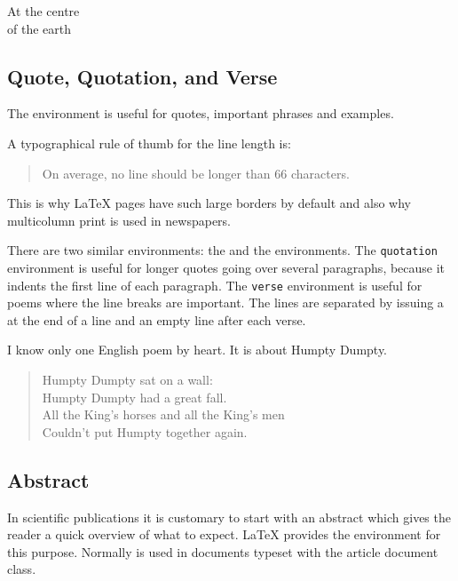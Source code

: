 \begin{example}
\begin{center}
At the centre\\of the earth
\end{center}
\end{example}

\subsection{Quote, Quotation, and Verse}

The  environment is useful for quotes, important phrases and
examples.

\begin{example}
A typographical rule of thumb
for the line length is:
\begin{quote}
On average, no line should
be longer than 66 characters.
\end{quote}
This is why \LaTeX{} pages have
such large borders by default
and also why multicolumn print
is used in newspapers.
\end{example}

There are two similar environments: the  and the
 environments. The \texttt{quotation} environment is useful
for longer quotes going over several paragraphs, because it indents the
first line of each paragraph. The \texttt{verse} environment is useful for poems
where the line breaks are important. The lines are separated by
issuing a \ci{\bs} at the end of a line and an empty line after each
verse.


\begin{example}
I know only one English poem by
heart. It is about Humpty Dumpty.
\begin{flushleft}
\begin{verse}
Humpty Dumpty sat on a wall:\\
Humpty Dumpty had a great fall.\\
All the King's horses and all
the King's men\\
Couldn't put Humpty together
again.
\end{verse}
\end{flushleft}
\end{example}

\subsection{Abstract}

In scientific publications it is customary to start with an abstract which
gives the reader a quick overview of what to expect. \LaTeX{} provides the
 environment for this purpose. Normally  is used
in documents typeset with the article document class.

